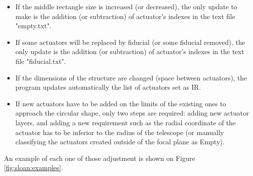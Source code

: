 \begin{itemize}
	\item If the middle rectangle size is increased (or decreased), the only update to make is the addition (or subtraction) of actuator's indexes in the text file "empty.txt".
	\item If some actuators will be replaced by fiducial (or some fiducial removed), the only update is the addition (or subtraction) of actuator's indexes in the text file "fiducial.txt".
	\item If the dimensions of the structure are changed (space between actuators), the program updates automatically the list of actuators set as IR.
	\item If new actuators have to be added on the limits of the existing ones to approach the circular shape, only two steps are required: adding new actuator layers, and adding a new requirement such as the radial coordinate of the actuator has to be inferior to the radius of the telescope (or manually classifying the actuators created outside of the focal plane as Empty).
\end{itemize}

An example of each one of those adjustment is shown on Figure \ref{fig:sloan:examples}.

